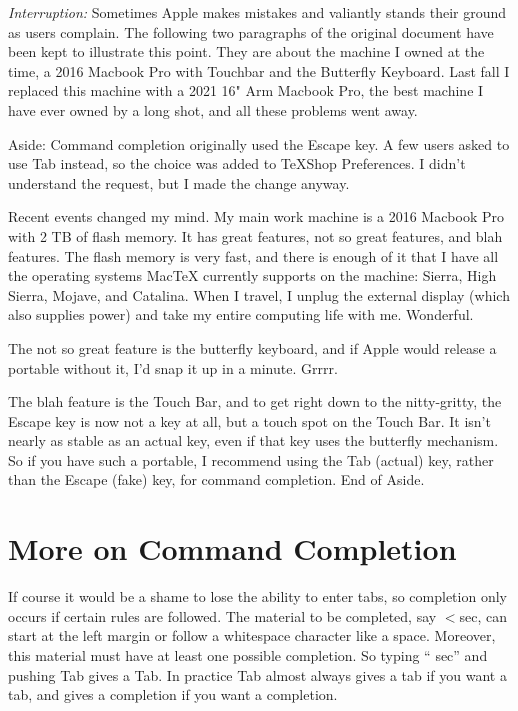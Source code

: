 \documentclass[11pt, oneside]{article}   	%
\begin{document}
{\em Interruption:} Sometimes Apple makes mistakes and valiantly stands their ground as users complain. The following two paragraphs of the original document have been kept to illustrate this point. They are about the machine I owned at the time, a 2016 Macbook Pro with Touchbar and the Butterfly Keyboard.  Last fall I replaced this machine with a 2021 16" Arm Macbook Pro, the best machine I have ever owned by a long shot, and all these problems went away.

\begin{quoting}
Aside: Command completion originally used the Escape key. A few users asked to use Tab instead, so the choice was added to TeXShop Preferences. I didn't understand the request, but I made the change anyway.

Recent events changed my mind. My main work machine is a 2016 Macbook Pro with 2 TB of flash memory. It has great features, not so great features, and blah features. The flash memory is very fast, and there is enough of it that I have all the operating systems MacTeX currently supports on the machine: Sierra, High Sierra, Mojave, and Catalina. When I travel, I unplug the external display (which also supplies power) and take my entire computing life with me. Wonderful.

The not so great feature is the butterfly keyboard, and if Apple would release a portable without it, I'd snap it up in a minute. Grrrr.

The blah feature is the Touch Bar, and to get right down to the nitty-gritty, the Escape key is now not a key at all, but a touch spot on the Touch Bar. It isn't nearly as stable as an actual key, even if that key uses the butterfly mechanism. So if you have such a portable, I recommend using the Tab (actual) key, rather than the Escape (fake) key, for command completion. End of Aside.
\end{quoting}

\section{More on Command Completion}
 
 If course it would be a shame to lose the ability to enter tabs, so  completion only occurs if certain rules are followed. The material to be completed, say $<$sec, can start at the left margin or follow a whitespace character like a space. Moreover,  this material must have at least one possible completion. So typing `` sec'' and pushing Tab gives a Tab.
 In practice Tab almost always gives a tab if you want a tab, and gives a completion if you want a completion.
 
\end{document}
